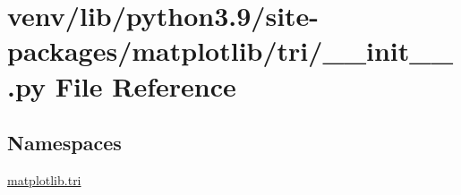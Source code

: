 \hypertarget{venv_2lib_2python3_89_2site-packages_2matplotlib_2tri_2____init_____8py}{}\section{venv/lib/python3.9/site-\/packages/matplotlib/tri/\+\_\+\+\_\+init\+\_\+\+\_\+.py File Reference}
\label{venv_2lib_2python3_89_2site-packages_2matplotlib_2tri_2____init_____8py}
\subsection*{Namespaces}
\begin{DoxyCompactItemize}
\item 
 \hyperlink{namespacematplotlib_1_1tri}{matplotlib.\+tri}
\end{DoxyCompactItemize}
